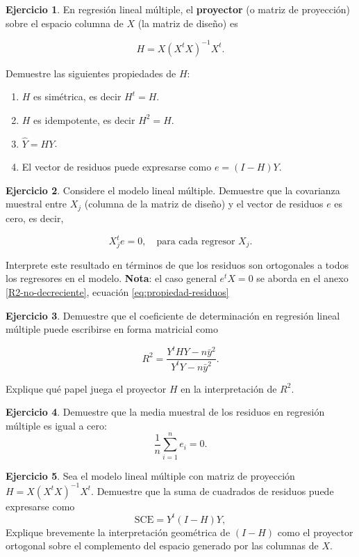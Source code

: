 \documentclass[
  11pt,
]{book}
\theoremstyle{definition}
\theoremstyle{definition}
\theoremstyle{definition}
\newtheorem{exercise}{Ejercicio}[chapter]
\theoremstyle{definition}
\theoremstyle{remark}
\begin{document}
\begin{exercise}

En regresión lineal múltiple, el \textbf{proyector} (o matriz de proyección) sobre el espacio columna de \(X\) (la matriz de diseño) es

\[
H = X(X^tX)^{-1}X^t.
\]

Demuestre las siguientes propiedades de \(H\):

\begin{enumerate}
\def\labelenumi{\arabic{enumi}.}
\item
  \(H\) es simétrica, es decir \(H^t = H\).
\item
  \(H\) es idempotente, es decir \(H^2 = H\).
\item
  \(\hat{Y}=HY\).
\item
  El vector de residuos puede expresarse como \(e=(I-H)Y\).
\end{enumerate}

\end{exercise}

\begin{exercise}
Considere el modelo lineal múltiple. Demuestre que la covarianza muestral entre \(X_j\) (columna de la matriz de diseño) y el vector de residuos \(e\) es cero, es decir,

\[
X_j^te = 0, \quad \text{para cada regresor } X_j.
\]

Interprete este resultado en términos de que los residuos son ortogonales a todos los regresores en el modelo. \textbf{Nota}: el caso general \(e^tX = 0\) se aborda en el anexo \ref{R2-no-decreciente}, ecuación \eqref{eq:propiedad-residuos}
\end{exercise}

\begin{exercise}
Demuestre que el coeficiente de determinación en regresión lineal múltiple puede escribirse en forma matricial como

\[
R^2 = \frac{Y^tHY - n\bar{y}^2}{Y^tY - n\bar{y}^2}.
\]

Explique qué papel juega el proyector \(H\) en la interpretación de \(R^2\).
\end{exercise}

\begin{exercise}
Demuestre que la media muestral de los residuos en regresión múltiple es igual a cero:
\[
\frac{1}{n}\sum_{i=1}^n e_i = 0.
\]
\end{exercise}

\begin{exercise}
Sea el modelo lineal múltiple con matriz de proyección \(H = X(X^tX)^{-1}X^t\). Demuestre que la suma de cuadrados de residuos puede expresarse como
\[
\text{SCE} = Y^t(I-H)Y,
\]
Explique brevemente la interpretación geométrica de \((I-H)\) como el proyector ortogonal sobre el complemento del espacio generado por las columnas de \(X\).
\end{exercise}
\end{document}
